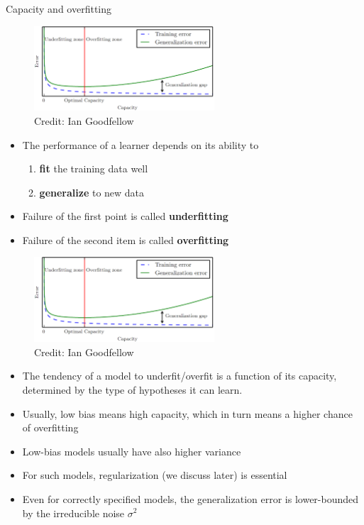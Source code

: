\documentclass[11pt,compress,t,notes=noshow, xcolor=table]{beamer}
\begin{document}
\begin{vbframe}{Capacity and overfitting}

  \begin{figure}
    \centering
    \includegraphics[width = 0.6\textwidth]{figure_man/lcurve_1.png}
    \tiny{\\ Credit: Ian Goodfellow}
  \end{figure}
  

\begin{itemize}
  \item 
    The performance of a learner depends on its ability to 
    \begin{enumerate}
      \item \textbf{fit} the training data well
      \item \textbf{generalize} to new data
    \end{enumerate}  
  \item Failure of the first point is called \textbf{underfitting}
  \item Failure of the second item is called \textbf{overfitting}
\end{itemize}  


\framebreak

\begin{figure}
  \centering
  \includegraphics[width = 0.6\textwidth]{figure_man/lcurve_1.png}
  \tiny{\\ Credit: Ian Goodfellow}
\end{figure}


\begin{itemize}
  \item The tendency of a model to underfit/overfit is a function of its capacity, determined by the type of hypotheses it can learn.
  \item Usually, low bias means high capacity, which in turn means a higher chance of overfitting
  \item Low-bias models usually have 
  also higher variance
  \item For such models, regularization (we discuss later) is essential
  \item Even for correctly specified models, the generalization error is lower-bounded by the irreducible noise $\sigma^2$
\end{itemize}
\end{vbframe}


\endlecture
\end{document}
